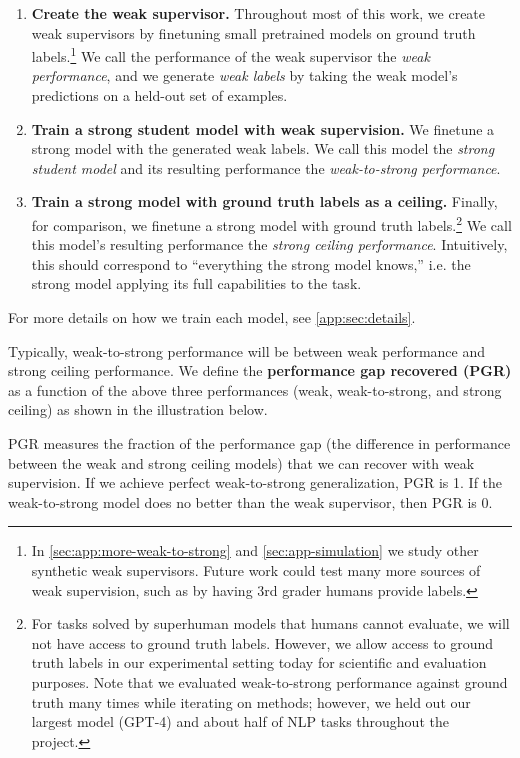 \begin{enumerate}
    \item \textbf{Create the weak supervisor.} Throughout most of this work, we create weak supervisors by finetuning small pretrained models on ground truth labels.\footnote{In \ref{sec:app:more-weak-to-strong} and \ref{sec:app-simulation} we study other synthetic weak supervisors. Future work could test many more sources of weak supervision, such as by having 3rd grader humans provide labels.} We call the performance of the weak supervisor the \textit{weak performance}, and we generate \emph{weak labels} by taking the weak model's predictions on a held-out set of examples.
    \item \textbf{Train a strong student model with weak supervision.} We finetune a strong model with the generated weak labels. We call this model the \emph{strong student model} and its resulting performance the \textit{weak-to-strong performance}.
    \item \textbf{Train a strong model with ground truth labels as a ceiling.} Finally, for comparison, we finetune a strong model with ground truth labels.\footnote{For tasks solved by superhuman models that humans cannot evaluate, we will not have access to ground truth labels. However, we allow access to ground truth labels in our experimental setting today for scientific and evaluation purposes. Note that we evaluated weak-to-strong performance against ground truth many times while iterating on methods; however, we held out our largest model (GPT-4) and about half of NLP tasks throughout the project. }  We call this model's resulting performance the \textit{strong ceiling performance}. Intuitively, this should correspond to ``everything the strong model knows,'' i.e. the strong model applying its full capabilities to the task.
\end{enumerate}

For more details on how we train each model, see \ref{app:sec:details}.

Typically, weak-to-strong performance will be between weak performance and strong ceiling performance.  We define the \textbf{performance gap recovered (PGR)} as a function of the above three performances (weak, weak-to-strong, and strong ceiling) as shown in the illustration below.

PGR measures the fraction of the performance gap (the difference in performance between the weak and strong ceiling models) that we can recover with weak supervision. If we achieve perfect weak-to-strong generalization, PGR is 1. If the weak-to-strong model does no better than the weak supervisor, then PGR is 0.


